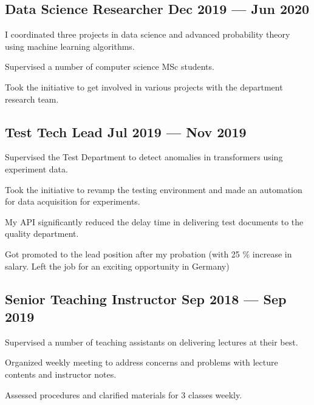 \documentclass[letter,11pt]{article}
\begin{document}
\subsection{{Data Science Researcher \hfill Dec 2019 --- Jun 2020}}
\begin{zitemize}
	\item I coordinated three projects in data science and advanced probability theory using machine learning algorithms.
	\item Supervised a number of computer science MSc students.
	\item Took the initiative to get involved in various projects with the department research team.
\end{zitemize}

\subsection{{Test Tech Lead \hfill Jul 2019 --- Nov 2019}}
\begin{zitemize}
	\item Supervised the Test Department to detect anomalies in transformers using experiment data.
	\item Took the initiative to revamp the testing environment and made an automation for data acquisition for experiments.
	\item My API significantly reduced the delay time in delivering test documents to the quality department.
	\item Got promoted to the lead position after my probation (with 25 \% increase in salary. Left the job for an exciting opportunity in Germany)
\end{zitemize}

\subsection{Senior Teaching Instructor \hfill Sep 2018 --- Sep 2019}
\begin{zitemize}
	\item Supervised a number of teaching assistants on delivering lectures at their best.
	\item Organized weekly meeting to address concerns and problems with lecture contents and instructor notes.
	\item Assessed procedures and clarified materials for 3 classes weekly.
\end{zitemize}
\end{document}
